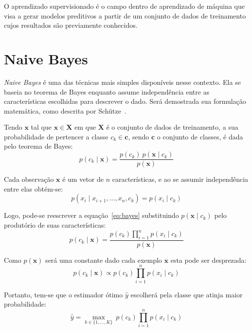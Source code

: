 O aprendizado supervisionado é o campo dentro de aprendizado de máquina que visa a gerar modelos preditivos a partir de
um conjunto de dados de treinamento cujos resultados são previamente conhecidos.

\section{Naive Bayes}

\textit{Naive Bayes} é uma das técnicas mais simples disponíveis nesse contexto.
Ela se baseia no teorema de Bayes enquanto assume independência entre as características escolhidas para descrever o
dado.
Será demostrada sua formulação matemática, como descrita por Schütze~\cite{schutze08}.

Tendo $\mathbf{x}$ tal que $\mathbf{x} \in \mathbf{X}$ em que $\mathbf{X}$ é o conjunto de dados de treinamento, a sua
probabilidade de pertencer a classe $c_k \in \mathbf{c}$, sendo $\mathbf{c}$ o conjunto de classes, é dada pelo teorema de Bayes:
\begin{equation} \label{eq:bayes}
    p(c_k \mid \mathbf{x}) = \frac{p(c_k) \ p(\mathbf{x} \mid c_k)}{p(\mathbf{x})}
\end{equation}

Cada observação $\mathbf{x}$ é um vetor de $n$ características, e ao se assumir independência entre elas obtém-se:
\begin{equation}
    p(x_i \mid x_{i+1}, \dots ,x_{n}, c_k ) = p(x_i \mid c_k)
\end{equation}

Logo, pode-se reescrever a equação~\ref{eq:bayes} substituindo $p(\mathbf{x} \mid c_k)$ pelo produtório de suas
características:
\begin{equation}
    p(c_k \mid \mathbf{x}) = \frac{p(c_k) \prod_{i=1}^n p(x_i \mid c_k)}{p(\mathbf{x})}
\end{equation}

Como $p(\mathbf{x})$ será uma constante dado cada exemplo $\mathbf{x}$ esta pode ser desprezada:
\begin{equation}
    p(c_k \mid \mathbf{x}) \propto p(c_k) \prod_{i=1}^n p(x_i \mid c_k)
\end{equation}

Portanto, tem-se que o estimador ótimo $\hat{y}$ escolherá pela classe que atinja maior probabilidade:
\begin{equation}
    \hat{y} = \underset{k \in \{1, \dots, K\}}{\operatorname{max}} \ p(c_k) \displaystyle\prod_{i=1}^n p(x_i \mid c_k)
\end{equation}

